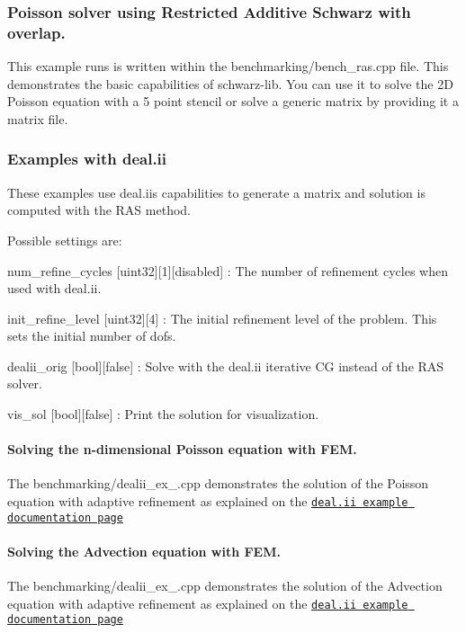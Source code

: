 \subsubsection*{Poisson solver using Restricted Additive Schwarz with overlap.}

This example runs is written within the {\ttfamily benchmarking/bench\+\_\+ras.\+cpp} file. This demonstrates the basic capabilities of {\ttfamily schwarz-\/lib}. You can use it to solve the 2D Poisson equation with a 5 point stencil or solve a generic matrix by providing it a matrix file.

\subsubsection*{Examples with deal.\+ii}

These examples use {\ttfamily deal.\+ii}\textquotesingle{}s capabilities to generate a matrix and solution is computed with the R\+AS method.

Possible settings are\+:


\begin{DoxyItemize}
\item {\ttfamily num\+\_\+refine\+\_\+cycles} \mbox{[}uint32\mbox{]}\mbox{[}1\mbox{]}\mbox{[}disabled\mbox{]} \+: The number of refinement cycles when used with {\ttfamily deal.\+ii}.
\item {\ttfamily init\+\_\+refine\+\_\+level} \mbox{[}uint32\mbox{]}\mbox{[}4\mbox{]} \+: The initial refinement level of the problem. This sets the initial number of dof\textquotesingle{}s.
\item {\ttfamily dealii\+\_\+orig} \mbox{[}bool\mbox{]}\mbox{[}false\mbox{]} \+: Solve with the deal.\+ii iterative CG instead of the R\+AS solver.
\item {\ttfamily vis\+\_\+sol} \mbox{[}bool\mbox{]}\mbox{[}false\mbox{]} \+: Print the solution for visualization.
\end{DoxyItemize}

\paragraph*{Solving the n-\/dimensional Poisson equation with F\+EM.}

The {\ttfamily benchmarking/dealii\+\_\+ex\+\_.\+cpp} demonstrates the solution of the Poisson equation with adaptive refinement as explained on the \href{https://www.dealii.org/developer/doxygen/deal.II/step_6.html}{\tt {\ttfamily deal.\+ii example documentation page}}

\paragraph*{Solving the Advection equation with F\+EM.}

The {\ttfamily benchmarking/dealii\+\_\+ex\+\_.\+cpp} demonstrates the solution of the Advection equation with adaptive refinement as explained on the \href{https://www.dealii.org/developer/doxygen/deal.II/step_9.html}{\tt {\ttfamily deal.\+ii example documentation page}} 